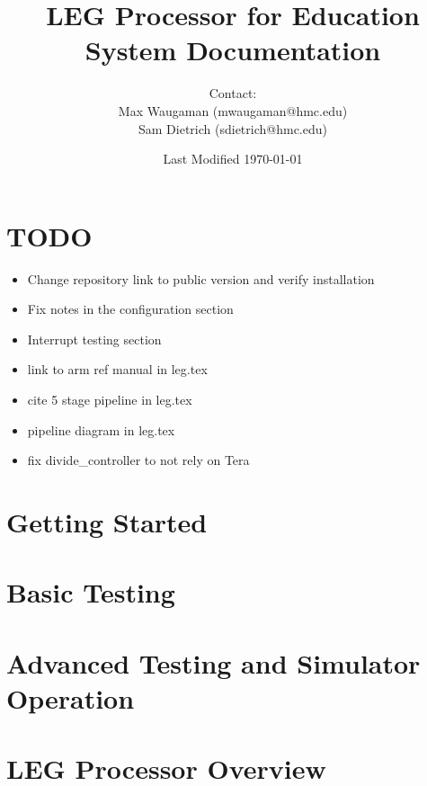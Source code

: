 \documentclass[12pt,letterpaper]{article}
\begin{document}
\title{LEG Processor for Education\\\Large{System Documentation}
}
\author{Contact: \\Max Waugaman (mwaugaman@hmc.edu) \\Sam Dietrich (sdietrich@hmc.edu)}
\date{Last Modified \today}
\maketitle
\thispagestyle{empty}
\pagebreak
\setcounter{page}{1}
\pagebreak

\tableofcontents
\pagebreak

\section{TODO}
\begin{itemize}
\item Change repository link to public version and verify installation
\item Fix notes in the configuration section
\item Interrupt testing section
\item link to arm ref manual in leg.tex
\item cite 5 stage pipeline in leg.tex
\item pipeline diagram in leg.tex
\item fix divide\_controller to not rely on Tera
\end{itemize}

\section{Getting Started}


\section{Basic Testing}

\pagebreak

\section{Advanced Testing and Simulator Operation}

\pagebreak

\section{LEG Processor Overview}

\end{document}
